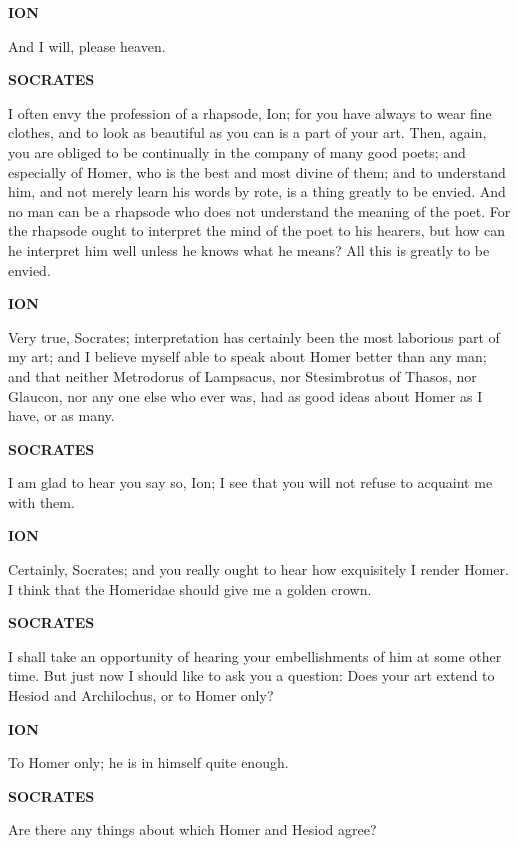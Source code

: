 \documentclass[11pt,letter]{article}
\begin{document}
\par \textbf{ION}
\par   And I will, please heaven.

\par \textbf{SOCRATES}
\par   I often envy the profession of a rhapsode, Ion; for you have always to wear fine clothes, and to look as beautiful as you can is a part of your art. Then, again, you are obliged to be continually in the company of many good poets; and especially of Homer, who is the best and most divine of them; and to understand him, and not merely learn his words by rote, is a thing greatly to be envied. And no man can be a rhapsode who does not understand the meaning of the poet. For the rhapsode ought to interpret the mind of the poet to his hearers, but how can he interpret him well unless he knows what he means? All this is greatly to be envied.

\par \textbf{ION}
\par   Very true, Socrates; interpretation has certainly been the most laborious part of my art; and I believe myself able to speak about Homer better than any man; and that neither Metrodorus of Lampsacus, nor Stesimbrotus of Thasos, nor Glaucon, nor any one else who ever was, had as good ideas about Homer as I have, or as many.

\par \textbf{SOCRATES}
\par   I am glad to hear you say so, Ion; I see that you will not refuse to acquaint me with them.

\par \textbf{ION}
\par   Certainly, Socrates; and you really ought to hear how exquisitely I render Homer. I think that the Homeridae should give me a golden crown.

\par \textbf{SOCRATES}
\par   I shall take an opportunity of hearing your embellishments of him at some other time. But just now I should like to ask you a question:  Does your art extend to Hesiod and Archilochus, or to Homer only?

\par \textbf{ION}
\par   To Homer only; he is in himself quite enough.

\par \textbf{SOCRATES}
\par   Are there any things about which Homer and Hesiod agree?
\end{document}
